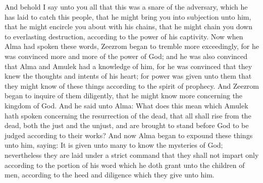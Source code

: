 And behold I say unto you all that this was a snare of the adversary, which he has laid to catch this people, that he might bring you into subjection unto him, that he might encircle you about with his chains, that he might chain you down to everlasting destruction, according to the power of his captivity.
\bverse \iffalse Now when Alma had spoken these words, Zeezrom began to tremble more exceedingly, for he was convinced more and more of the power of God; and he was also convinced that Alma and Amulek had a knowledge of him, for he was convinced that they knew the thoughts and intents of his heart; for power was given unto them that they might know of these things according to the spirit of prophecy. \fi
Now when Alma had spoken these words, Zeezrom began to tremble more exceedingly, for he was convinced more and more of the power of God; and he was also convinced that Alma and Amulek had a knowledge of him, for he was convinced that they knew the thoughts and intents of his heart; for power was given unto them that they might know of these things according to the spirit of prophecy.
\bverse \iffalse And Zeezrom began to inquire of them diligently, that he might know more concerning the kingdom of God. And he said unto Alma: What does this mean which Amulek hath spoken concerning the resurrection of the dead, that all shall rise from the dead, both the just and the unjust, and are brought to stand before God to be judged according to their works? \fi
And Zeezrom began to inquire of them diligently, that he might know more concerning the kingdom of God. And he said unto Alma: What does this mean which Amulek hath spoken concerning the resurrection of the dead, that all shall rise from the dead, both the just and the unjust, and are brought to stand before God to be judged according to their works?
\bverse \iffalse And now Alma began to expound these things unto him, saying: It is given unto many to know the mysteries of God; nevertheless they are laid under a strict command that they shall not impart only according to the portion of his word which he doth grant unto the children of men, according to the heed and diligence which they give unto him. \fi
And now Alma began to expound these things unto him, saying: It is given unto many to know the mysteries of God; nevertheless they are laid under a strict command that they shall not impart only according to the portion of his word which he doth grant unto the children of men, according to the heed and diligence which they give unto him.
\bverse \iffalse And therefore, he that will harden his heart, the same receiveth the lesser portion of the word; and he that will not harden his heart, to him is given the greater portion of the word, until it is given unto him to know the mysteries of God until he know them in full. \fi
